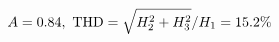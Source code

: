 \documentclass[preview]{standalone}
\begin{document}
\begin{align*}
\special{dvisvgm:raw <g id='unique000'>}A=0.84,\ \text{THD}=\sqrt{H_2^2+H_3^2}/H_1=15.2\%\special{dvisvgm:raw </g>}
\end{align*}
\end{document}
